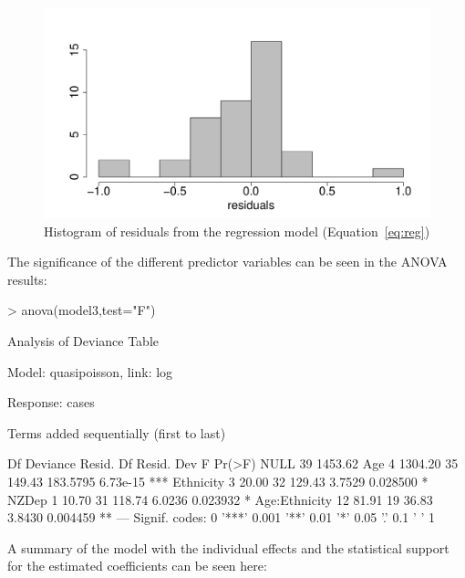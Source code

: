 \documentclass{article}
\begin{document}
\begin{figure}[h!]
\begin{center}
\includegraphics{interimreport2-017}
\end{center}
\caption{Histogram of residuals from the regression model (Equation~\ref{eq:reg})}
\label{fig:resid}
\end{figure}
The significance of the different predictor variables can be seen in the ANOVA results:

\begin{Schunk}
\begin{Sinput}
> anova(model3,test="F")
\end{Sinput}
\begin{Soutput}
Analysis of Deviance Table

Model: quasipoisson, link: log

Response: cases

Terms added sequentially (first to last)


              Df Deviance Resid. Df Resid. Dev        F   Pr(>F)    
NULL                             39    1453.62                      
Age            4  1304.20        35     149.43 183.5795 6.73e-15 ***
Ethnicity      3    20.00        32     129.43   3.7529 0.028500 *  
NZDep          1    10.70        31     118.74   6.0236 0.023932 *  
Age:Ethnicity 12    81.91        19      36.83   3.8430 0.004459 ** 
---
Signif. codes:  0 '***' 0.001 '**' 0.01 '*' 0.05 '.' 0.1 ' ' 1
\end{Soutput}
\end{Schunk}

A summary of the model with the individual effects and the statistical support for the estimated coefficients can be seen here:
\end{document}
